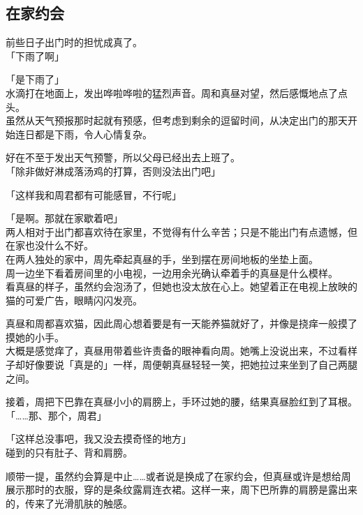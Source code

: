 \subsection{在家约会}

前些日子出门时的担忧成真了。\\

「下雨了啊」

「是下雨了」\\

水滴打在地面上，发出哗啦哗啦的猛烈声音。周和真昼对望，然后感慨地点了点头。\\%

虽然从天气预报那时起就有预感，但考虑到剩余的逗留时间，从决定出门的那天开始连日都是下雨，令人心情复杂。

好在不至于发出天气预警，所以父母已经出去上班了。\\

「除非做好淋成落汤鸡的打算，否则没法出门吧」

「这样我和周君都有可能感冒，不行呢」

「是啊。那就在家歇着吧」\\

两人相对于出门都喜欢待在家里，不觉得有什么辛苦；只是不能出门有点遗憾，但在家也没什么不好。\\

在两人独处的家中，周先牵起真昼的手，坐到摆在房间地板的坐垫上面。\\

周一边坐下看着房间里的小电视，一边用余光确认牵着手的真昼是什么模样。\\

看真昼的样子，虽然约会泡汤了，但她也没太放在心上。她望着正在电视上放映的猫的可爱广告，眼睛闪闪发亮。

真昼和周都喜欢猫，因此周心想着要是有一天能养猫就好了，并像是挠痒一般摸了摸她的小手。\\

大概是感觉痒了，真昼用带着些许责备的眼神看向周。她嘴上没说出来，不过看样子却好像要说「真是的」一样，周便朝真昼轻轻一笑，把她拉过来坐到了自己两腿之间。

接着，周把下巴靠在真昼小小的肩膀上，手环过她的腰，结果真昼脸红到了耳根。\\

「……那、那个，周君」

「这样总没事吧，我又没去摸奇怪的地方」\\

碰到的只有肚子、背和肩膀。

顺带一提，虽然约会算是中止……或者说是换成了在家约会，但真昼或许是想给周展示那时的衣服，穿的是条纹露肩连衣裙。这样一来，周下巴所靠的肩膀是露出来的，传来了光滑肌肤的触感。\\

